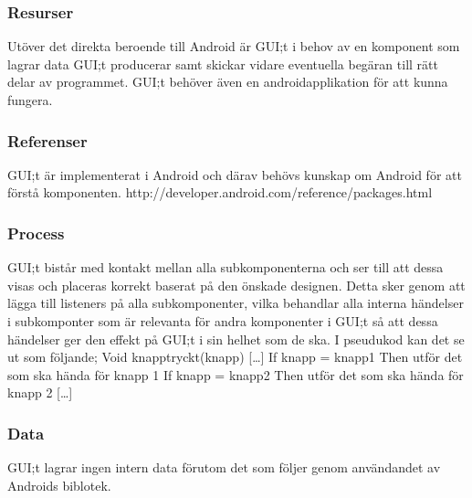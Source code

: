 \subsubsection{Resurser}
Utöver det direkta beroende till Android är GUI;t i behov av en komponent som lagrar data GUI;t producerar samt skickar vidare eventuella begäran till rätt delar av programmet. GUI;t behöver även en androidapplikation för att kunna fungera.

\subsubsection{Referenser}
GUI;t är implementerat i Android och därav behövs kunskap om Android för att förstå komponenten.
http://developer.android.com/reference/packages.html

\subsubsection{Process}
GUI;t bistår med kontakt mellan alla subkomponenterna och ser till att dessa visas och placeras korrekt baserat på den önskade designen. Detta sker genom att lägga till listeners på alla subkomponenter, vilka behandlar alla interna händelser i subkomponter som är relevanta för andra komponenter i GUI;t  så att dessa händelser ger den effekt på GUI;t i sin helhet som de ska. I pseudukod kan det se ut som följande;
Void knapptryckt(knapp)
[…]
If knapp = knapp1
Then utför det som ska hända för knapp 1
If knapp = knapp2
Then utför det som ska hända för knapp 2
[…]

\subsubsection{Data}
GUI;t lagrar ingen intern data förutom det som följer genom användandet av Androids biblotek.